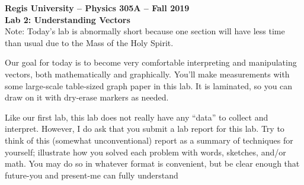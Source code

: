 \documentclass[11pt]{article}
\begin{document}
\begin{center}
{\bf{Regis University -- Physics 305A -- Fall 2019}} \\
{\bf{Lab 2: Understanding Vectors}} \\
{\footnotesize Note: Today's lab is abnormally short because one section will have less time than usual due to the Mass of the Holy Spirit.}
\medskip
\end{center}
\medskip 

\noindent Our goal for today is to become very comfortable interpreting and manipulating vectors, both mathematically and graphically. You'll make measurements with some large-scale table-sized graph paper in this lab.  It is laminated, so you can draw on it with dry-erase markers as needed.

Like our first lab, this lab does not really have any ``data'' to collect and interpret. However, I do ask that you submit a lab report for this lab. Try to think of this (somewhat unconventional) report as a summary of techniques for yourself; illustrate how you solved each problem with words, sketches, and/or math. You may do so in whatever format is convenient, but be clear enough that future-you and present-me can fully understand 
\end{document}
